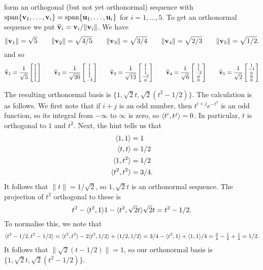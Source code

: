  form an orthogonal (but not yet orthonormal) sequence with
 $\operatorname{span}\{\mathbf{v}_1,\dotsc,\mathbf{v}_i\}=\operatorname{span}\{\mathbf{u}_1,\dotsc,\mathbf{u}_i\}$ for
 $i=1,\dotsc,5$.  To get an orthonormal sequence we put
 $\widehat{\mathbf{v}}_i=\mathbf{v}_i/\|\mathbf{v}_i\|$.  We have
 \[ \|\mathbf{v}_1\| = \sqrt{5} \hspace{2em}
    \|\mathbf{v}_2\| = \sqrt{4/5} \hspace{2em}
    \|\mathbf{v}_3\| = \sqrt{3/4} \hspace{2em}
    \|\mathbf{v}_4\| = \sqrt{2/3} \hspace{2em}
    \|\mathbf{v}_5\| = \sqrt{1/2}.
 \]
 and so
 \[
  \widehat{\mathbf{v}}_1 = \frac{1}{\sqrt{5}}\left[\begin{smallmatrix} 1\\ 1\\ 1\\ 1\\ 1\end{smallmatrix}\right] \hspace{2em}
  \widehat{\mathbf{v}}_2 = \frac{1}{\sqrt{20}}\left[\begin{smallmatrix} 1\\ 1\\ 1\\ 1\\ -4\end{smallmatrix}\right] \hspace{2em}
  \widehat{\mathbf{v}}_3 = \frac{1}{\sqrt{12}}\left[\begin{smallmatrix} 1\\ 1\\ 1\\ -3 \\ 0\end{smallmatrix}\right] \hspace{2em}
  \widehat{\mathbf{v}}_4 = \frac{1}{\sqrt{6}}\left[\begin{smallmatrix} 1\\ 1\\ -2 \\ 0 \\ 0 \end{smallmatrix}\right] \hspace{2em}
  \widehat{\mathbf{v}}_5 = \frac{1}{\sqrt{2}}\left[\begin{smallmatrix} 1\\ -1\\ 0\\ 0\\ 0\end{smallmatrix}\right]
 \]
\EndDeferredSolution

 The resulting orthonormal basis is
 $\{1,\sqrt{2}t,\sqrt{2}(t^2-1/2)\}$.  The calculation is as
 follows.  We first note that if $i+j$ is an odd number, then
 $t^{i+j}e^{-t^2}$ is an odd function, so its integral from
 $-\infty$ to $\infty$ is zero, so $\langle t^i,t^j\rangle=0$.  In
 particular, $t$ is orthogonal to $1$ and $t^2$.  Next,
 the hint tells us that
 \begin{align*}
  \langle 1,1\rangle &= 1 \\
  \langle t,t\rangle &= 1/2 \\
  \langle 1,t^2\rangle &= 1/2 \\
  \langle t^2,t^2\rangle &= 3/4.
 \end{align*}
 It follows that $\|t\|=1/\sqrt{2}$, so $1,\sqrt{2}t$ is an
 orthonormal sequence.  The projection of $t^2$ orthogonal
 to these is
 \[
  t^2 - \langle t^2,1\rangle1 - \langle t^2,\sqrt{2}t\rangle \sqrt{2}t
   = t^2 - 1/2.
 \]
 To normalise this, we note that
 \[ \langle t^2-1/2,t^2-1/2\rangle =
     \langle t^2,t^2\rangle - 2\langle t^2,1/2\rangle + \langle 1/2,1/2\rangle =
     3/4 - \langle t^2,1\rangle + \langle 1,1\rangle/4 =
     \tfrac{3}{4} - \tfrac{1}{2} + \tfrac{1}{4} = 1/2.
 \]
 It follows that $\|\sqrt{2}(t-1/2)\|=1$, so our orthonormal
 basis is $\{1,\sqrt{2}t,\sqrt{2}(t^2-1/2)\}$.
\EndDeferredSolution

